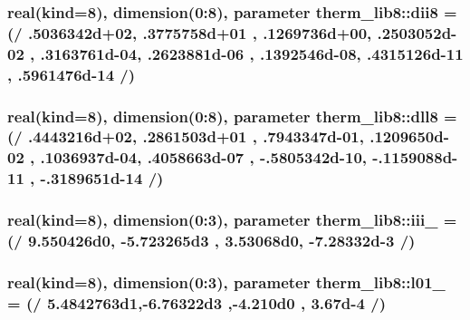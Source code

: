 \subsubsection[{\texorpdfstring{dii8}{dii8}}]{\setlength{\rightskip}{0pt plus 5cm}real(kind=8), dimension(0\+:8), parameter therm\+\_\+lib8\+::dii8 = (/ .\+5036342d+02, .\+3775758d+01 , .\+1269736d+00, .\+2503052d-\/02 , .\+3163761d-\/04, .\+2623881d-\/06 , .\+1392546d-\/08, .\+4315126d-\/11 , .\+5961476d-\/14 /)}\hypertarget{namespacetherm__lib8_a3bfe64ca1b1761eb7fddc3aa544df182}{}\label{namespacetherm__lib8_a3bfe64ca1b1761eb7fddc3aa544df182}
\subsubsection[{\texorpdfstring{dll8}{dll8}}]{\setlength{\rightskip}{0pt plus 5cm}real(kind=8), dimension(0\+:8), parameter therm\+\_\+lib8\+::dll8 = (/ .\+4443216d+02, .\+2861503d+01 , .\+7943347d-\/01, .\+1209650d-\/02 , .\+1036937d-\/04, .\+4058663d-\/07 , -\/.\+5805342d-\/10, -\/.\+1159088d-\/11 , -\/.\+3189651d-\/14 /)}\hypertarget{namespacetherm__lib8_adbebbc1cdfb1af05d0cf1f50b2f0df90}{}\label{namespacetherm__lib8_adbebbc1cdfb1af05d0cf1f50b2f0df90}
\subsubsection[{\texorpdfstring{iii\+\_\+78}{iii_78}}]{\setlength{\rightskip}{0pt plus 5cm}real(kind=8), dimension(0\+:3), parameter therm\+\_\+lib8\+::iii\+\_ = (/ 9.\+550426d0, -\/5.\+723265d3 , 3.\+53068d0, -\/7.\+28332d-\/3 /)}\hypertarget{namespacetherm__lib8_ae4acd61a7c0e6a8e640771554e879769}{}\label{namespacetherm__lib8_ae4acd61a7c0e6a8e640771554e879769}
\subsubsection[{\texorpdfstring{l01\+\_\+108}{l01_108}}]{\setlength{\rightskip}{0pt plus 5cm}real(kind=8), dimension(0\+:3), parameter therm\+\_\+lib8\+::l01\+\_ = (/ 5.\+4842763d1,-\/6.\+76322d3 ,-\/4.\+210d0 , 3.\+67d-\/4 /)}\hypertarget{namespacetherm__lib8_a2874cfd6a2661d95f8a2b827ebbd1d5d}{}\label{namespacetherm__lib8_a2874cfd6a2661d95f8a2b827ebbd1d5d}
